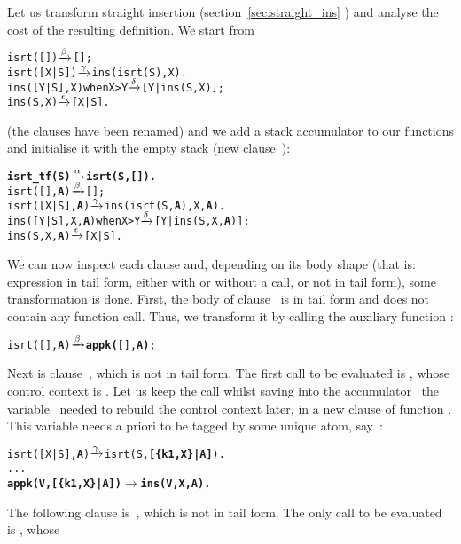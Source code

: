 Let us transform straight insertion (section~\ref{sec:straight_ins}
) and analyse the cost of the resulting
definition. We start from
\begin{alltt}
isrt(   [])             \(\smashedrightarrow{\beta}\) [];
isrt([X|S])             \(\smashedrightarrow{\gamma}\) ins(isrt(S),X).
ins([Y|S],X) when X > Y \(\smashedrightarrow{\delta}\) [Y|ins(S,X)];
ins(    S,X)            \(\smashedrightarrow{\epsilon}\) [X|S].
\end{alltt}
(the clauses have been renamed) and we add a stack accumulator to our
functions and initialise it with the empty stack (new
clause~\clause{\alpha}):
\begin{alltt}
\textbf{isrt\_tf(S)                \(\smashedrightarrow{\alpha}\) isrt(S,[]).}
isrt(   [],\textbf{A})             \(\smashedrightarrow{\beta}\) [];\hfill% A \emph{unused yet}
isrt([X|S],\textbf{A})             \(\smashedrightarrow{\gamma}\) ins(isrt(S,\textbf{A}),X,\textbf{A}).
ins([Y|S],X,\textbf{A}) when X > Y \(\smashedrightarrow{\delta}\) [Y|ins(S,X,\textbf{A})];
ins(    S,X,\textbf{A})            \(\smashedrightarrow{\epsilon}\) [X|S].\hfill% A \emph{unused yet}
\end{alltt}
We can now inspect each clause and, depending on its body shape (that
is: expression in tail form, either with or without a call, or not in
tail form), some transformation is done. First, the body of
clause~\clause{\beta} is in tail form and does not contain any
function call. Thus, we transform it by calling the auxiliary
function :
\begin{alltt}
isrt(   [],\textbf{A})             \(\smashedrightarrow{\beta}\) \textbf{appk(}[],\textbf{A)};
\end{alltt}
Next is clause~\clause{\gamma}, which is not in tail form. The first
call to be evaluated is , whose control context is
. Let us keep the call whilst
saving into the accumulator~ the variable~
needed to rebuild the control context later, in a new clause of
function . This variable needs a priori to be tagged
by some unique atom, say~:
\begin{alltt}
isrt([X|S],\textbf{A})             \(\smashedrightarrow{\gamma}\) isrt(S,\textbf{[\{k1,X\}|A]}).
...
\textbf{appk(V,[\{k1,X\}|A])        \(\rightarrow\) ins(V,X,A).}
\end{alltt}
The following clause is~\clause{\delta}, which is not in tail
form. The only call to be evaluated is , whose
